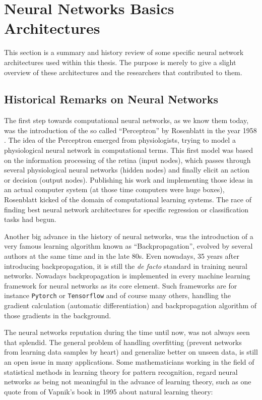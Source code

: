 
\section{Neural Networks Basics Architectures}\label{sec:prev_nn}
\thesisStateRevised
This section is a summary and history review of some specific neural network architectures used within this thesis.
The purpose is merely to give a slight overview of these architectures and the researchers that contributed to them.



\subsection{Historical Remarks on Neural Networks}\label{sec:prev_nn_history}
The first step towards computational neural networks, as we know them today, was the introduction of the so called \enquote{Perceptron} by Rosenblatt in the year 1958 \cite{Rosenblatt1958}. 
The idea of the Perceptron emerged from physiologists, trying to model a physiological neural network in computational terms. 
This first model was based on the information processing of the retina (input nodes), which passes through several physiological neural networks (hidden nodes) and finally elicit an action or decision (output nodes).
Publishing his work and implementing those ideas in an actual computer system (at those time computers were huge boxes), Rosenblatt kicked of the domain of computational learning systems.
The race of finding best neural network architectures for specific regression or classification tasks had begun.

Another big advance in the history of neural networks, was the introduction of a very famous learning algorithm known as \enquote{Backpropagation}, evolved by several authors at the same time \cite{LeCun1986} and \cite{Rumelhart1986} in the late 80s. 
Even nowadays, 35 years after introducing backpropagation, it is still the \emph{de facto} standard in training neural networks.
Nowadays backpropagation is implemented in every machine learning framework for neural networks as its core element.
Such frameworks are for instance \texttt{Pytorch} \cite{Pytorch} or \texttt{Tensorflow} \cite{Tensorflow} and of course many others, handling the gradient calculation (automatic differentiation) and backpropagation algorithm of those gradients in the background.

The neural networks reputation during the time until now, was not always seen that splendid.
The general problem of handling overfitting (prevent networks from learning data samples by heart) and generalize better on unseen data, is still an open issue in many applications.
Some mathematicians working in the field of statistical methods in learning theory for pattern recognition, regard neural networks as being not meaningful in the advance of learning theory, such as one quote from \cite{Vapnik1995} of Vapnik's book in 1995 about natural learning theory:

